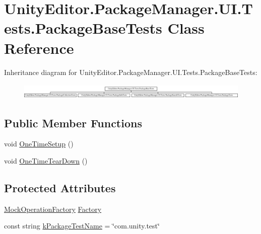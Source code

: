 \hypertarget{class_unity_editor_1_1_package_manager_1_1_u_i_1_1_tests_1_1_package_base_tests}{}\section{Unity\+Editor.\+Package\+Manager.\+U\+I.\+Tests.\+Package\+Base\+Tests Class Reference}
\label{class_unity_editor_1_1_package_manager_1_1_u_i_1_1_tests_1_1_package_base_tests}
Inheritance diagram for Unity\+Editor.\+Package\+Manager.\+U\+I.\+Tests.\+Package\+Base\+Tests\+:\begin{figure}[H]
\begin{center}
\leavevmode
\includegraphics[height=0.754717cm]{class_unity_editor_1_1_package_manager_1_1_u_i_1_1_tests_1_1_package_base_tests}
\end{center}
\end{figure}
\subsection*{Public Member Functions}
\begin{DoxyCompactItemize}
\item 
void \mbox{\hyperlink{class_unity_editor_1_1_package_manager_1_1_u_i_1_1_tests_1_1_package_base_tests_a8dfe28a04bd2b333692b555a4a2f6b9b}{One\+Time\+Setup}} ()
\item 
void \mbox{\hyperlink{class_unity_editor_1_1_package_manager_1_1_u_i_1_1_tests_1_1_package_base_tests_ace84b6ad212da6d6f3a8b55834d39f1c}{One\+Time\+Tear\+Down}} ()
\end{DoxyCompactItemize}
\subsection*{Protected Attributes}
\begin{DoxyCompactItemize}
\item 
\mbox{\hyperlink{class_unity_editor_1_1_package_manager_1_1_u_i_1_1_tests_1_1_mock_operation_factory}{Mock\+Operation\+Factory}} \mbox{\hyperlink{class_unity_editor_1_1_package_manager_1_1_u_i_1_1_tests_1_1_package_base_tests_af2b2bd5acb144a46619ffa922f01d080}{Factory}}
\item 
const string \mbox{\hyperlink{class_unity_editor_1_1_package_manager_1_1_u_i_1_1_tests_1_1_package_base_tests_abc4043fbd68eb046d466063f1f5b7bf1}{k\+Package\+Test\+Name}} = \char`\"{}com.\+unity.\+test\char`\"{}
\end{DoxyCompactItemize}



